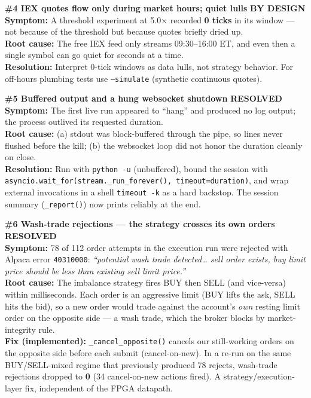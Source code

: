 \documentclass[10pt,a4paper]{article}
\newcommand{\fixed}{\textcolor{okgreen}{\textbf{RESOLVED}}}
\newcommand{\bydesign}{\textcolor{accentteal}{\textbf{BY DESIGN}}}
\begin{document}
\begin{issuebox}
\textbf{\#4 \quad IEX quotes flow only during market hours; quiet lulls} \hfill \bydesign\\
\textbf{Symptom:} A threshold experiment at 5.0\(\times\) recorded \textbf{0 ticks}
in its window --- not because of the threshold but because quotes briefly dried
up.\\
\textbf{Root cause:} The free IEX feed only streams 09:30--16:00 ET, and even
then a single symbol can go quiet for seconds at a time.\\
\textbf{Resolution:} Interpret 0-tick windows as data lulls, not strategy
behavior. For off-hours plumbing tests use \texttt{--simulate} (synthetic
continuous quotes).
\end{issuebox}

\begin{issuebox}
\textbf{\#5 \quad Buffered output and a hung websocket shutdown} \hfill \fixed\\
\textbf{Symptom:} The first live run appeared to ``hang'' and produced no log
output; the process outlived its requested duration.\\
\textbf{Root cause:} (a) stdout was block-buffered through the pipe, so lines
never flushed before the kill; (b) the websocket loop did not honor the
duration cleanly on close.\\
\textbf{Resolution:} Run with \texttt{python -u} (unbuffered), bound the session
with \texttt{asyncio.wait\_for(stream.\_run\_forever(), timeout=duration)}, and
wrap external invocations in a shell \texttt{timeout -k} as a hard backstop. The
session summary (\texttt{\_report()}) now prints reliably at the end.
\end{issuebox}

\begin{issuebox}
\textbf{\#6 \quad Wash-trade rejections --- the strategy crosses its own orders} \hfill \fixed\\
\textbf{Symptom:} 78 of 112 order attempts in the execution run were rejected
with Alpaca error \texttt{40310000}: \emph{``potential wash trade detected\dots
sell order exists, buy limit price should be less than existing sell limit
price.''}\\
\textbf{Root cause:} The imbalance strategy fires BUY then SELL (and vice-versa)
within milliseconds. Each order is an aggressive limit (BUY lifts the ask, SELL
hits the bid), so a new order would trade against the account's \emph{own}
resting limit order on the opposite side --- a wash trade, which the broker
blocks by market-integrity rule.\\
\textbf{Fix (implemented):} \texttt{\_cancel\_opposite()} cancels our still-working
orders on the opposite side before each submit (cancel-on-new). In a
re-run on the same BUY/SELL-mixed regime that previously produced 78 rejects,
wash-trade rejections dropped to \textbf{0} (34 cancel-on-new actions fired).
A strategy/execution-layer fix, independent of the FPGA datapath.
\end{issuebox}
\end{document}
